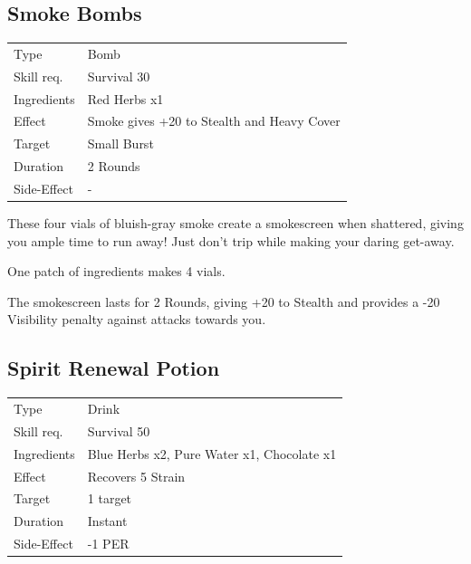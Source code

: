 \documentclass[11pt,a4paper,twocolumn]{book}
\begin{document}
\subsection*{Smoke Bombs}
{
	\begin{tabu} to 75mm{| X[l,4] | X[l,8] |}
		\hline
		Type 			& Bomb 														\\
        Skill req.	    & Survival 30 												\\
        Ingredients     & Red Herbs x1												\\
        Effect     		& Smoke gives +20 to Stealth and Heavy Cover 				\\
        Target      	& Small Burst												\\
        Duration  		& 2 Rounds	 												\\
        Side-Effect     & -															\\ \hline
	\end{tabu}
		
}

\medskip

These four vials of bluish-gray smoke create a smokescreen when shattered, giving you ample time to run away! Just don't trip while making your daring get-away.

One patch of ingredients makes 4 vials.

The smokescreen lasts for 2 Rounds, giving +20 to Stealth and provides a -20 Visibility penalty against attacks towards you.


\subsection*{Spirit Renewal Potion}
{
	\begin{tabu} to 75mm{| X[l,4] | X[l,8] |}
		\hline
		Type 			& Drink 													\\
        Skill req.	    & Survival 50 												\\
        Ingredients     & Blue Herbs x2, Pure Water x1, Chocolate x1				\\
        Effect     		& Recovers 5 Strain 										\\
        Target      	& 1 target													\\
        Duration  		& Instant	 												\\
        Side-Effect     & -1 PER													\\ \hline
	\end{tabu}
		
}
\end{document}
